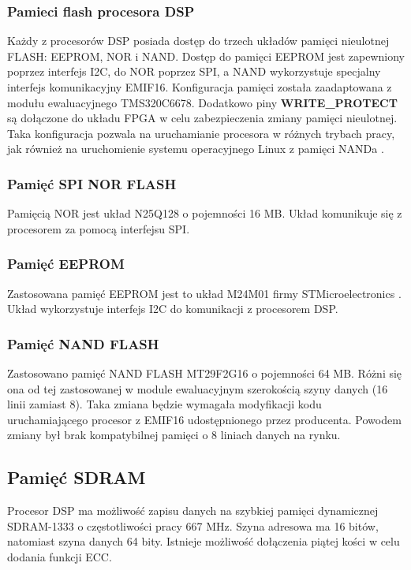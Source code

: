 \subsubsection{Pamieci flash procesora DSP}
Każdy z procesorów DSP posiada dostęp do trzech układów pamięci nieulotnej FLASH: EEPROM, NOR i NAND. Dostęp do pamięci EEPROM jest zapewniony poprzez interfejs I2C, do NOR poprzez SPI, a NAND wykorzystuje specjalny interfejs komunikacyjny EMIF16. Konfiguracja pamięci została zaadaptowana z modułu ewaluacyjnego TMS320C6678. Dodatkowo piny \textbf{WRITE\_PROTECT} są dołączone do układu FPGA w celu zabezpieczenia zmiany pamięci nieulotnej. Taka konfiguracja pozwala na uruchamianie procesora w różnych trybach pracy, jak również na uruchomienie systemu operacyjnego Linux z pamięci NANDa \cite{DSP:BOOT}.
\subsubsection{Pamięć SPI NOR FLASH}
Pamięcią NOR jest układ N25Q128 \cite{N25Q128} o pojemności 16 MB. Układ komunikuje się z procesorem za pomocą interfejsu SPI.
\subsubsection{Pamięć EEPROM}
Zastosowana pamięć EEPROM jest to układ M24M01 \cite{M24M01} firmy STMicroelectronics \cite{STM}. Układ wykorzystuje interfejs I2C do komunikacji z procesorem DSP.
\subsubsection{Pamięć NAND FLASH }
Zastosowano pamięć NAND FLASH MT29F2G16 \cite{MT29F2G16} o pojemności 64 MB. Różni się ona od tej zastosowanej w module ewaluacyjnym szerokością szyny danych (16 linii zamiast 8). Taka zmiana będzie wymagała modyfikacji kodu uruchamiającego procesor z EMIF16 udostępnionego przez producenta. Powodem zmiany był brak kompatybilnej pamięci o 8 liniach danych na rynku. 
\subsection{Pamięć SDRAM }
Procesor DSP ma możliwość zapisu danych na szybkiej pamięci dynamicznej SDRAM-1333 o częstotliwości pracy 667 MHz. Szyna adresowa ma 16 bitów, natomiast szyna danych 64 bity. Istnieje możliwość dołączenia piątej kości w celu dodania funkcji ECC. 
